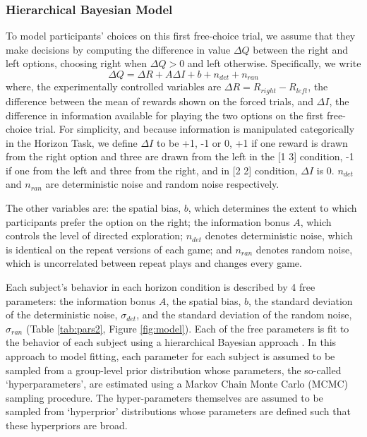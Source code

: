 \documentclass[12pt]{article}
\begin{document}
	\subsubsection*{Hierarchical Bayesian Model}
	
	To model participants' choices on this first free-choice trial, we assume that they make decisions by computing the difference in value $\Delta Q$ between the right and left options, choosing right when $\Delta Q > 0$ and left otherwise.  Specifically, we write
	\begin{equation}
	\Delta Q= \Delta R+A \Delta    I+b+n_{det}+n_{ran}
	\end{equation}
	where, the experimentally controlled variables are $\Delta R=R_{right}-R_{left}$, the difference between the mean of rewards shown on the forced trials, and $\Delta I$, the difference in information available for playing the two options on the first free-choice trial. For simplicity, and because information is manipulated categorically in the Horizon Task, we define $\Delta I$ to be +1, -1 or 0, +1 if one reward is drawn from the right option and three are drawn from the left in the [1 3] condition, -1 if one from the left and three from the right, and in [2 2] condition, $\Delta I$ is 0. $n_{det}$ and $n_{ran}$ are deterministic noise and random noise respectively. 
	
	The other variables are: the spatial bias, $b$, which determines the extent to which participants prefer the option on the right; the information bonus $A$, which controls the level of directed exploration; $n_{det}$ denotes deterministic noise, which is identical on the repeat versions of each game; and $n_{ran}$ denotes random noise, which is uncorrelated between repeat plays and changes every game.
	
	Each subject's behavior in each horizon condition is described by 4 free parameters: the information bonus $A$, the spatial bias, $b$, the standard deviation of the deterministic noise, $\sigma_{det}$, and the standard deviation of the random noise, $\sigma_{ran}$ (Table \ref{tab:pars2}, Figure \ref{fig:model}). Each of the free parameters is fit to the behavior of each subject using a hierarchical Bayesian approach \citep{hbm1}.  In this approach to model fitting, each parameter for each subject is assumed to be sampled from a group-level prior distribution whose parameters, the so-called `hyperparameters', are estimated using a Markov Chain Monte Carlo (MCMC) sampling procedure. The hyper-parameters themselves are assumed to be sampled from `hyperprior' distributions whose parameters are defined such that these hyperpriors are broad.  
	
\end{document}
